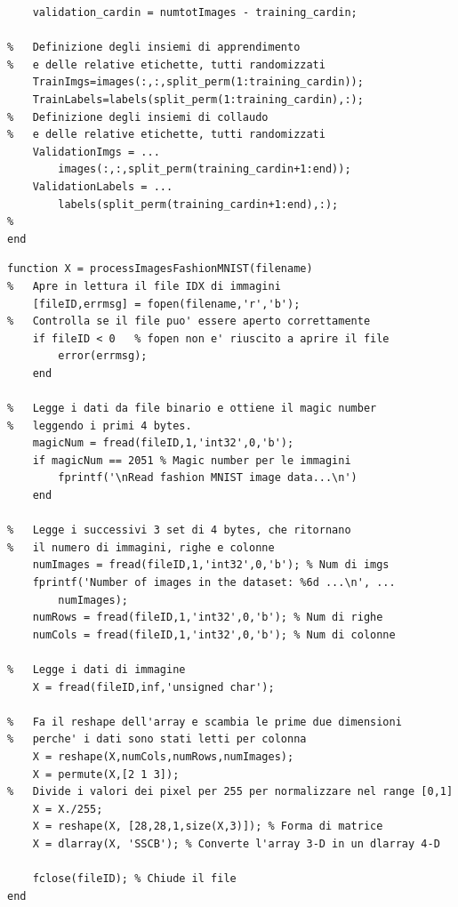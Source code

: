 \documentclass[a4paper,12pt]{article}
\begin{document}
\begin{lstlisting}[style=Matlab-editor,title=\texttt{FashionMNIST\_DataPrep.m},label=lst:dataprep]
%   Cardinalita' dell'insieme di collaudo (validation)
    validation_cardin = numtotImages - training_cardin;   

%   Definizione degli insiemi di apprendimento 
%   e delle relative etichette, tutti randomizzati
    TrainImgs=images(:,:,split_perm(1:training_cardin));
    TrainLabels=labels(split_perm(1:training_cardin),:);
%   Definizione degli insiemi di collaudo 
%   e delle relative etichette, tutti randomizzati
    ValidationImgs = ...
        images(:,:,split_perm(training_cardin+1:end));
    ValidationLabels = ... 
        labels(split_perm(training_cardin+1:end),:);
%
end
\end{lstlisting}



\newpage
\begin{lstlisting}[style=Matlab-editor,title=\texttt{processImagesFashionMNIST.m},label=lst:processimages]
function X = processImagesFashionMNIST(filename)
%   Apre in lettura il file IDX di immagini 
    [fileID,errmsg] = fopen(filename,'r','b');
%   Controlla se il file puo' essere aperto correttamente
    if fileID < 0   % fopen non e' riuscito a aprire il file
        error(errmsg);
    end

%   Legge i dati da file binario e ottiene il magic number 
%   leggendo i primi 4 bytes. 
    magicNum = fread(fileID,1,'int32',0,'b');
    if magicNum == 2051 % Magic number per le immagini
        fprintf('\nRead fashion MNIST image data...\n')
    end

%   Legge i successivi 3 set di 4 bytes, che ritornano 
%   il numero di immagini, righe e colonne
    numImages = fread(fileID,1,'int32',0,'b'); % Num di imgs
    fprintf('Number of images in the dataset: %6d ...\n', ... 
        numImages);
    numRows = fread(fileID,1,'int32',0,'b'); % Num di righe
    numCols = fread(fileID,1,'int32',0,'b'); % Num di colonne

%   Legge i dati di immagine
    X = fread(fileID,inf,'unsigned char');

%   Fa il reshape dell'array e scambia le prime due dimensioni
%   perche' i dati sono stati letti per colonna
    X = reshape(X,numCols,numRows,numImages);
    X = permute(X,[2 1 3]);
%   Divide i valori dei pixel per 255 per normalizzare nel range [0,1] 
    X = X./255;
    X = reshape(X, [28,28,1,size(X,3)]); % Forma di matrice
    X = dlarray(X, 'SSCB'); % Converte l'array 3-D in un dlarray 4-D

    fclose(fileID); % Chiude il file
end
\end{lstlisting}
\end{document}
